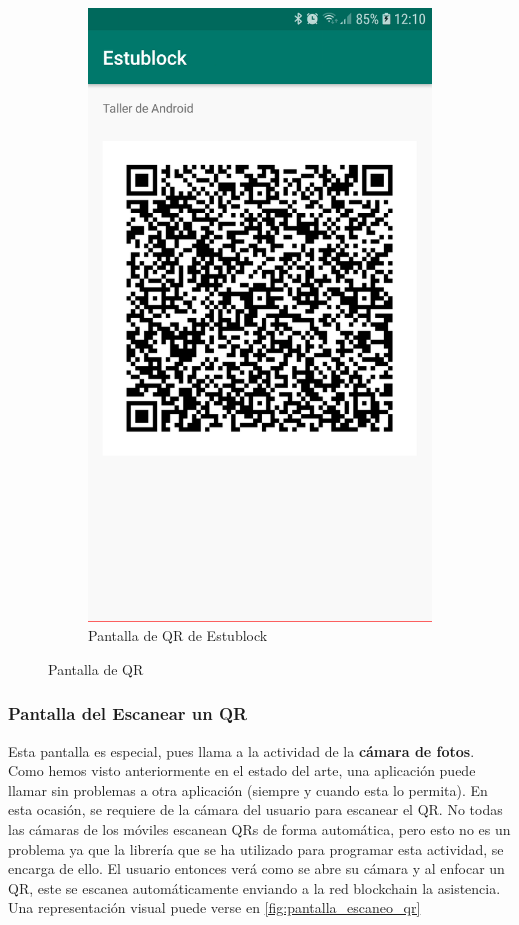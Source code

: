\begin{figure}[hbt]
\begin{subfigure}[b]{0.4\linewidth}
        \includegraphics[width=0.7\linewidth]{figs/Desarrollo/Interfaz/estublock_QR}
        \caption[Estublock QR]{Pantalla de QR de Estublock}
	\end{subfigure} 
	\caption[Pantalla de QR]{Pantalla de QR}
	\label{fig:pantalla_qr}
\end{figure}

\subsubsection{Pantalla del Escanear un QR}

Esta pantalla es especial, pues llama a la actividad de la \textbf{cámara de fotos}. Como hemos visto anteriormente en el estado del arte, una aplicación puede llamar sin problemas a otra aplicación (siempre y cuando esta lo permita). En esta ocasión, se requiere de la cámara del usuario para escanear el QR. No todas las cámaras de los móviles escanean QRs de forma automática, pero esto no es un problema ya que la librería que se ha utilizado para programar esta actividad, se encarga de ello. El usuario entonces verá como se abre su cámara y al enfocar un QR, este se escanea automáticamente enviando a la red blockchain la asistencia. Una representación visual puede verse en \ref{fig:pantalla_escaneo_qr}

